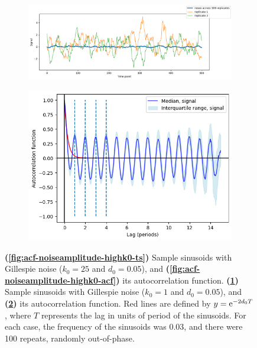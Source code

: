 \begin{figure}
  \begin{subfigure}[t]{0.6\textwidth}
  \centering
    \includegraphics[width=\linewidth]{gillespie_k1_d0p05_mean.png}
    \caption{
    }
    \label{fig:acf-noiseamplitude-lowk0-ts}
  \end{subfigure}%
  \begin{subfigure}[t]{0.4\textwidth}
  \centering
    \includegraphics[width=\linewidth]{gillespie_k1_d0p05_acf.png}
    \caption{
    }
    \label{fig:acf-noiseamplitude-lowk0-acf}
  \end{subfigure}

  \caption[
    Effect of birth rate of Gillespie noise on the autocorrelation function.
  ]{
    \textbf{(\ref{fig:acf-noiseamplitude-highk0-ts})} Sample sinusoids with Gillespie noise ($k_{0} = 25$ and $d_{0} = 0.05$), and
    \textbf{(\ref{fig:acf-noiseamplitude-highk0-acf})} its autocorrelation function.
    \textbf{(\ref{fig:acf-noiseamplitude-lowk0-ts})} Sample sinusoids with Gillespie noise ($k_{0} = 1$ and $d_{0} = 0.05$), and
    \textbf{(\ref{fig:acf-noiseamplitude-lowk0-acf})} its autocorrelation function.
    Red lines are defined by $y = \mathrm{e}^{-2d_{0}T}$, where $T$ represents the lag in units of period of the sinusoids.
    For each case, the frequency of the sinusoids was 0.03, and there were 100 repeats, randomly out-of-phase.
  }
  \label{fig:acf-noiseamplitude}
\end{figure}

